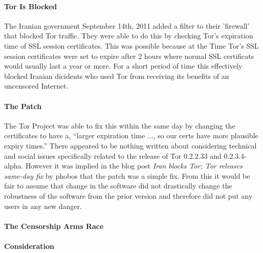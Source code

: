 \documentclass[11pt]{article}
\begin{document}
\begin{multicols}{2}
\paragraph{Tor Is Blocked}

The Iranian government September 14th, 2011 added a filter to their 'firewall'
that blocked Tor traffic. They were able to do this by checking Tor's expiration
time of SSL session certificates. This was possible because at the Time Tor's
SSL session certificates were set to expire after 2 hours where normal SSL
certificats would usually last a year or more. For a short period of time this
effectively blocked Iranian dicidents who used Tor from receiving its benefits
of an uncensored Internet. \cite{IranBlocksTorSameDayFix}

\paragraph{The Patch} 

The Tor Project was able to fix this within the same day by changing the
certificates to have a, ``larger expiration time ..., so our certs have more
plausible expiry times.'' \cite{IranBlocksTorSameDayFix} There appeared to be
nothing written about considering technical and social issues specifically
related to the release of Tor 0.2.2.33 and 0.2.3.4-alpha.  However it was
implied in the blog post \textit{Iran blocks Tor; Tor releases same-day fix} by
phobos that the patch was a simple fix. \cite{IranBlocksTorSameDayFix} From this
it would be fair to assume that change in the software did not drastically
change the robustness of the software from the prior version and therefore did
not put any users in any new danger.

\paragraph{The Censorship Arms Race}



\paragraph{Consideration}





\end{multicols}
\end{document}
